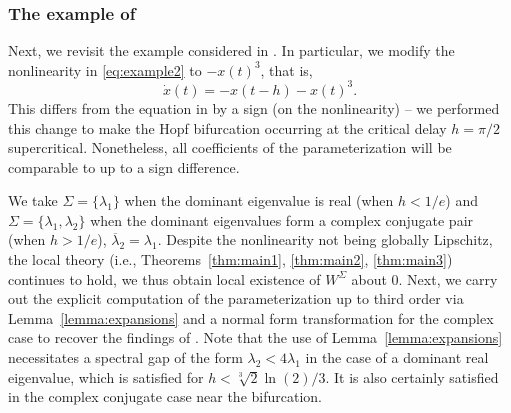 \documentclass[a4paper, 12pt, oneside, reqno, notitlepage]{amsart}
\theoremstyle{plain}
\theoremstyle{definition}
\theoremstyle{remark}
\begin{document}
\subsubsection{The example of \texorpdfstring{\cite{szaksz2025spectral}}{[SOS25]}}
\label{sect:szaksz}

Next, we revisit the example considered in \cite{szaksz2025spectral}. 
In particular, we modify the nonlinearity in \eqref{eq:example2} to $-x(t)^3$, that is,
\begin{equation}
    \dot{x}(t) = - x(t-h) - x(t)^3.
    \label{eq:szaksz}
\end{equation}
This differs from the equation in \cite{szaksz2025spectral} by a sign (on the nonlinearity) -- 
we performed this change to make the Hopf bifurcation occurring at the critical delay $h = \pi/2$ supercritical.
Nonetheless, all coefficients of the parameterization will be comparable to \cite{szaksz2025spectral} up to a sign difference.


We take $\Sigma =\{\lambda_1\}$ when the dominant eigenvalue is real (when $h < 1/e$) and $\Sigma = \{\lambda_1,\lambda_2\}$ when the dominant eigenvalues form a complex conjugate pair (when $h > 1/e$), $\overline{\lambda}_2 = \lambda_1$.
Despite the nonlinearity not being globally Lipschitz,
the local theory (i.e., Theorems~\ref{thm:main1}, \ref{thm:main2}, \ref{thm:main3}) continues to hold, we thus obtain local existence of $W^\Sigma$ about $0$.
Next, we carry out the explicit computation of the parameterization up to third order via Lemma~\ref{lemma:expansions} and a normal form transformation for the complex case to recover the findings of \cite{szaksz2025spectral}. 
Note that the use of Lemma~\ref{lemma:expansions} necessitates a spectral gap of the form $\lambda_2 < 4\lambda_1$ in the case of a dominant real eigenvalue,
which is satisfied for $ h < \sqrt[3]{2} \ln(2)/3$.
It is also certainly satisfied in the complex conjugate case near the bifurcation.
\end{document}
